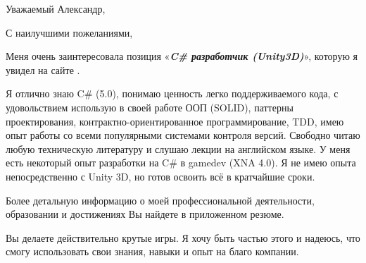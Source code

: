 


\date{9 марта 2014 г.}
\opening{Уважаемый Александр,}
\closing{С наилучшими пожеланиями,}

\makelettertitle

Меня очень заинтересовала позиция «\textit{\textbf{C\# разработчик (Unity3D)}}», которую я увидел на сайте \protect{}.

Я отлично знаю C\# (5.0), понимаю ценность легко поддерживаемого кода, с удовольствием использую в своей работе ООП (SOLID), паттерны проектирования, контрактно-ориентированное программирование, TDD, имею опыт работы со всеми популярными системами контроля версий. Свободно читаю любую техническую литературу и слушаю лекции на английском языке. У меня есть некоторый опыт разработки на C\# в gamedev (XNA 4.0). Я не имею опыта непосредственно с Unity 3D, но готов освоить всё в кратчайшие сроки.

Более детальную информацию о моей профессиональной деятельности, образовании и достижениях Вы найдете в приложенном резюме.

Вы делаете действительно крутые игры. Я хочу быть частью этого и надеюсь, что смогу использовать свои знания, навыки и опыт на благо компании.

\makeletterclosing
